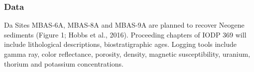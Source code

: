 \subsubsection{Data}Da
Sites MBAS-6A, MBAS-8A and MBAS-9A are planned to recover Neogene sediments (Figure 1; Hobbs et al., 2016). Proceeding chapters of IODP 369 will include lithological descriptions, biostratigraphic ages. Logging tools include gamma ray, color reflectance, porosity, density, magnetic susceptibility, uranium, thorium and potassium concentrations.
